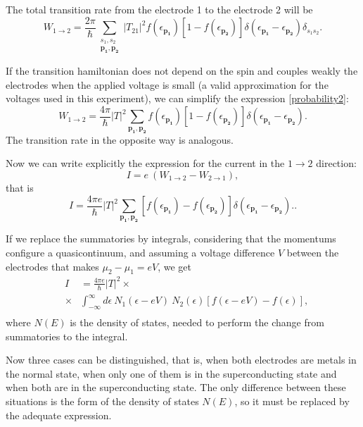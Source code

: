 \documentclass[twocolumn, twoside,a4paper,10pt]{article}
\begin{document}
The total transition rate from the electrode 1 to the electrode 2 will be
\begin{equation}\label{probability2}
W_{1\to 2} = \frac{2\pi}{\hbar} \sum_{\substack{s_1,s_2\\ \mathbf{p_1},\mathbf{p_2}}} |T_{21}|^2 
		f(\epsilon_{\mathbf{p_1}}) [1-f(\epsilon_{\mathbf{p_2}})] 
		\delta(\epsilon_{\mathbf{p_1}}-\epsilon_{\mathbf{p_2}})\delta_{s_1s_2}.
\end{equation}

If the transition hamiltonian does not depend on the spin and couples weakly the electrodes when the applied voltage is small (a valid approximation for the voltages used in this experiment), we can simplify the expression \eqref{probability2}:
\begin{equation}\label{probability3}
W_{1\to 2} = \frac{4\pi}{\hbar} |T|^2 \sum_{\mathbf{p_1},\mathbf{p_2}}  
		f(\epsilon_{\mathbf{p_1}}) [1-f(\epsilon_{\mathbf{p_2}})] 
		\delta(\epsilon_{\mathbf{p_1}}-\epsilon_{\mathbf{p_2}}).
\end{equation}
The transition rate in the opposite way is analogous.

Now we can write explicitly the expression for the current in the $1\to 2$ direction:
\begin{equation}\label{current1}
I = e\ (W_{1\to 2} - W_{2\to 1}),
\end{equation}
that is
\begin{equation}\label{current2}
I = \frac{4\pi e}{\hbar} |T|^2 \sum_{\mathbf{p_1},\mathbf{p_2}}  
		[f(\epsilon_{\mathbf{p_1}})-f(\epsilon_{\mathbf{p_2}})] 
		\delta(\epsilon_{\mathbf{p_1}}-\epsilon_{\mathbf{p_2}})..
\end{equation}

If we replace the summatories by integrals, considering that the momentums configure a quasicontinuum, and assuming a voltage difference $V$ between the electrodes that makes $\mu_2-\mu_1=eV$, we get
\begin{eqnarray}\label{current3}
&I& = \frac{4\pi e}{\hbar}  |T|^2 \times
	\nonumber \\
	&\times& \int_{-\infty}^{\infty} d\epsilon\ N_1(\epsilon-eV)\ N_2(\epsilon) [f(\epsilon-eV)-f(\epsilon)],
	\nonumber \\
\end{eqnarray}
where $N(E)$ is the density of states, needed to perform the change from summatories to the integral.

Now three cases can be distinguished, that is, when both electrodes are metals in the normal state, when only one of them is in the superconducting state and when both are in the superconducting state. The only difference between these situations is the form of the density of states $N(E)$, so it must be replaced by the adequate expression.
\end{document}
